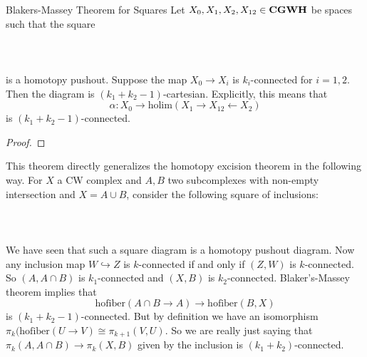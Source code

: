 \documentclass[a4paper]{article}
\begin{document}
\begin{thm}{Blakers-Massey Theorem for Squares}{} Let $X_0,X_1,X_2,X_{12}\in\bold{CGWH}$ be spaces such that the square \\~\\
\\~\\
is a homotopy pushout. Suppose the map $X_0\to X_i$ is $k_i$-connected for $i=1,2$. Then the diagram is $(k_1+k_2-1)$-cartesian. Explicitly, this means that $$\alpha:X_0\to\text{holim}(X_1\rightarrow X_{12}\leftarrow X_2)$$ is $(k_1+k_2-1)$-connected. 
\begin{proof}

\end{proof}
\end{thm}

This theorem directly generalizes the homotopy excision theorem in the following way. For $X$ a CW complex and $A,B$ two subcomplexes with non-empty intersection and $X=A\cup B$, consider the following square of inclusions: \\~\\
\\~\\
We have seen that such a square diagram is a homotopy pushout diagram. Now any inclusion map $W\hookrightarrow Z$ is $k$-connected if and only if $(Z,W)$ is $k$-connected. So $(A,A\cap B)$ is $k_1$-connected and $(X,B)$ is $k_2$-connected. Blaker's-Massey theorem implies that $$\text{hofiber}(A\cap B\to A)\to\text{hofiber}(B,X)$$ is $(k_1+k_2-1)$-connected. But by definition we have an isomorphism $\pi_k(\text{hofiber}(U\to V)\cong\pi_{k+1}(V,U)$. So we are really just saying that $\pi_k(A,A\cap B)\to\pi_k(X,B)$ given by the inclusion is $(k_1+k_2)$-connected. 
\end{document}
